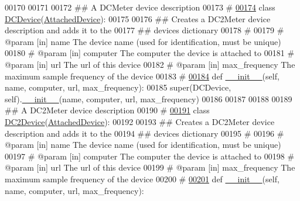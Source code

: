 \begin{DoxyCode}
00170 
00171 
00172 \textcolor{comment}{## A DCMeter device description}
00173 \textcolor{comment}{#}
\hypertarget{settings__classes_8py_source_l00174}{}\hyperlink{classsettings__classes_1_1_d_c_device}{00174} \textcolor{keyword}{class }\hyperlink{classsettings__classes_1_1_d_c_device}{DCDevice}(\hyperlink{classsettings__classes_1_1_attached_device}{AttachedDevice}):
00175     
00176     \textcolor{comment}{## Creates a DC2Meter device description and adds it to the}
00177     \textcolor{comment}{## devices dictionary}
00178     \textcolor{comment}{#}
00179     \textcolor{comment}{# @param [in] name           The device name (used for identification, must
       be unique)}
00180     \textcolor{comment}{# @param [in] computer       The computer the device is attached to}
00181     \textcolor{comment}{# @param [in] url            The url of this device}
00182     \textcolor{comment}{# @param [in] max\_frequency  The maximum sample frequency of the device}
00183     \textcolor{comment}{#}
\hypertarget{settings__classes_8py_source_l00184}{}\hyperlink{classsettings__classes_1_1_d_c_device_ac775ee34451fdfa742b318538164070e}{00184}     \textcolor{keyword}{def }\hyperlink{classsettings__classes_1_1_d_c_device_ac775ee34451fdfa742b318538164070e}{__init__}(self, name, computer, url, max\_frequency):
00185         super(DCDevice, self).\hyperlink{classsettings__classes_1_1_d_c_device_ac775ee34451fdfa742b318538164070e}{__init__}(name, computer, url, max\_frequency)
00186 
00187 
00188 
00189 \textcolor{comment}{## A DC2Meter device description}
00190 \textcolor{comment}{#}
\hypertarget{settings__classes_8py_source_l00191}{}\hyperlink{classsettings__classes_1_1_d_c2_device}{00191} \textcolor{keyword}{class }\hyperlink{classsettings__classes_1_1_d_c2_device}{DC2Device}(\hyperlink{classsettings__classes_1_1_attached_device}{AttachedDevice}):
00192     
00193     \textcolor{comment}{## Creates a DC2Meter device description and adds it to the}
00194     \textcolor{comment}{## devices dictionary}
00195     \textcolor{comment}{#}
00196     \textcolor{comment}{# @param [in] name           The device name (used for identification, must
       be unique)}
00197     \textcolor{comment}{# @param [in] computer       The computer the device is attached to}
00198     \textcolor{comment}{# @param [in] url            The url of this device}
00199     \textcolor{comment}{# @param [in] max\_frequency  The maximum sample frequency of the device}
00200     \textcolor{comment}{#}
\hypertarget{settings__classes_8py_source_l00201}{}\hyperlink{classsettings__classes_1_1_d_c2_device_ac775ee34451fdfa742b318538164070e}{00201}     \textcolor{keyword}{def }\hyperlink{classsettings__classes_1_1_d_c2_device_ac775ee34451fdfa742b318538164070e}{__init__}(self, name, computer, url, max\_frequency):

\end{DoxyCode}
